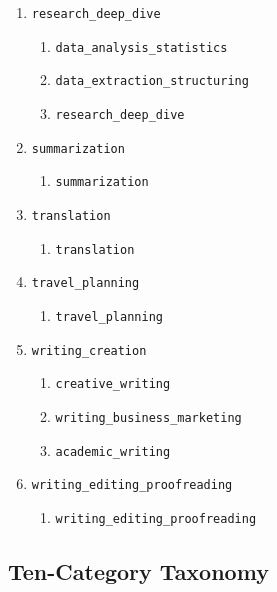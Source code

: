 \documentclass{article}
\begin{document}
\begin{enumerate}
    \item \texttt{research\_deep\_dive}
    \begin{enumerate}
        \item \texttt{data\_analysis\_statistics}
        \item \texttt{data\_extraction\_structuring}
        \item \texttt{research\_deep\_dive}
    \end{enumerate}

    \item \texttt{summarization}
    \begin{enumerate}
        \item \texttt{summarization}
    \end{enumerate}

    \item \texttt{translation}
    \begin{enumerate}
        \item \texttt{translation}
    \end{enumerate}

    \item \texttt{travel\_planning}
    \begin{enumerate}
        \item \texttt{travel\_planning}
    \end{enumerate}

    \item \texttt{writing\_creation}
    \begin{enumerate}
        \item \texttt{creative\_writing}
        \item \texttt{writing\_business\_marketing}
        \item \texttt{academic\_writing}
    \end{enumerate}

    \item \texttt{writing\_editing\_proofreading}
    \begin{enumerate}
        \item \texttt{writing\_editing\_proofreading}
    \end{enumerate}
\end{enumerate}

\subsection{Ten-Category Taxonomy}
\label{app:intent_10}
\end{document}
